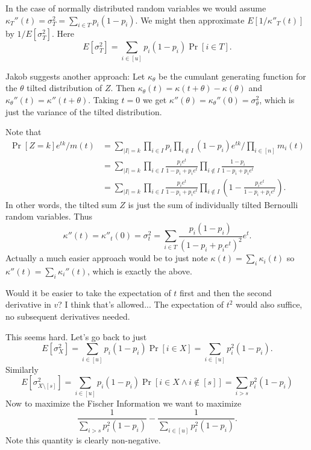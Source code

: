 \documentclass[11pt]{article}
\begin{document}
In the case of normally distributed random variables we would assume
$\kappa_T''(t) = \sigma_T^2 = \sum_{i\in T} p_i(1-p_i)$.
We might then approximate $E[1/\kappa''_T(t)]$ by $1/E[\sigma_T^2]$.
Here
\[
   E[\sigma_T^2] = \sum_{i\in [u]}p_i(1-p_i)\Pr[i\in T].
\]

\begin{displayquote}

   Jakob suggests another approach:
   Let $\kappa_\theta$ be the cumulant generating function for the $\theta$ tilted distribution of $Z$.
   Then $\kappa_\theta(t) = \kappa(t+\theta) - \kappa(\theta)$ and $\kappa_\theta''(t) = \kappa''(t+\theta)$.
   Taking $t=0$ we get $\kappa''(\theta) = \kappa_\theta''(0) = \sigma_\theta^2$, which is just the variance of the tilted distribution.

   Note that
   \begin{align}
      \Pr[Z=k]e^{tk}/m(t)
      &= \sum_{|I|=k}\prod_{i\in I}p_i\prod_{i\not\in I}(1-p_i) e^{tk}/\prod_{i\in[n]}m_i(t)
    \\&= \sum_{|I|=k}\prod_{i\in I}\frac{p_ie^t}{1-p_i+p_i e^t}\prod_{i\not\in I}\frac{1-p_i}{1-p_i+p_ie^t}
    \\&= \sum_{|I|=k}\prod_{i\in I}\frac{p_ie^t}{1-p_i+p_i e^t}\prod_{i\not\in I}\left(1-\frac{p_i e^t}{1-p_i+p_ie^t}\right).
   \end{align}
   In other words, the tilted sum $Z$ is just the sum of individually tilted Bernoulli random variables.
   Thus
   \[
      \kappa''(t)
      = \kappa''_t(0)
      = \sigma_t^2
      = \sum_{i\in T} \frac{p_i(1-p_i)}{(1-p_i+p_i e^t)^2}e^t
      .
   \]
   Actually a much easier approach would be to just note $\kappa(t) = \sum_i \kappa_i(t)$ so $\kappa''(t) = \sum_i \kappa_i''(t)$, which is exactly the above.

\end{displayquote}

Would it be easier to take the expectation of $t$ first and then the second derivative in $v$?
I think that's allowed...
The expectation of $t^2$ would also suffice, no subsequent derivatives needed.

This seems hard.
Let's go back to just
\[
   E[\sigma_X^2]
   = \sum_{i\in[u]}p_i(1-p_i)\Pr[i\in X]
   = \sum_{i\in[u]}p_i^2(1-p_i).
\]
Similarly 
\[
   E[\sigma_{X\setminus[s]}^2]
   = \sum_{i\in[u]}p_i(1-p_i)\Pr[i\in X \wedge i\not\in [s]]
   = \sum_{i > s}p_i^2(1-p_i)
\]
Now to maximize the Fischer Information we want to maximize
\[
   \frac1{\sum_{i > s}p_i^2(1-p_i)}
   - 
   \frac{1}{\sum_{i\in[u]}p_i^2(1-p_i)}
   .
\]
Note this quantity is clearly non-negative.
\end{document}
